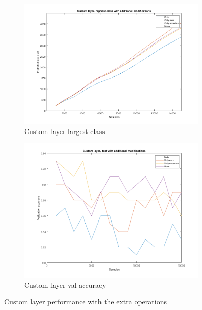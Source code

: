 \begin{figure}
    \centering
    \begin{subfigure}[b]{.45\textwidth}
        \centering
        \includegraphics[width=\textwidth]{figures/customhigh.png}
        \caption{Custom layer largest class}
        \label{sfig:ex:extra:customhigh}
    \end{subfigure}
    \hfill
    \begin{subfigure}[b]{.45\textwidth}
        \centering
        \includegraphics[width=\textwidth]{figures/customva.png}
        \caption{Custom layer val accuracy}
        \label{sfig:ex:extra:customva}
    \end{subfigure}
    \caption{Custom layer performance with the extra operations}
    \label{fig:ex:extra:custom}
\end{figure}

